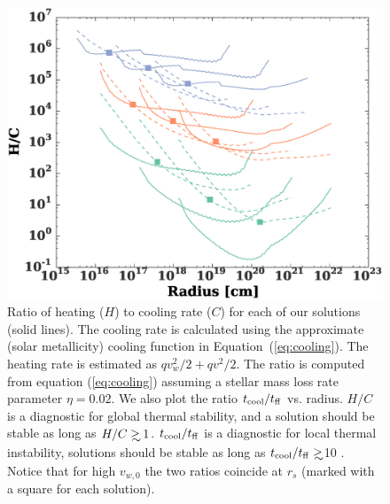 \documentclass[usenatbib,fleqn]{mn2e}
\newcommand\lsim{\mathrel{\rlap{\lower4pt\hbox{\hskip1pt$\sim$}}
    \raise1pt\hbox{$<$}}}
\newcommand\gsim{\mathrel{\rlap{\lower4pt\hbox{\hskip1pt$\sim$}}
    \raise1pt\hbox{$>$}}}
\newcommand{\rs}{r_s}
\newcommand{\vw}{v_w}
\newcommand{\vwO}{v_{w,0}}
\newcommand{\tcool}{t_{\rm cool}}
\newcommand{\tff}{t_{\rm ff}}
\begin{document}


\begin{figure}
  \includegraphics[width=\columnwidth]{cooling.eps}
  \caption{\label{fig:cooling} Ratio of heating ($H$) to cooling rate
    ($C$) for each of our solutions (solid lines). The cooling rate is
    calculated using the approximate (solar metallicity) cooling
    function in Equation~(\ref{eq:cooling}). The heating rate is
    estimated as $q \vw^2/2+q v^2/2$. The ratio is computed from
    equation (\ref{eq:cooling}) assuming a stellar mass loss rate
    parameter $\eta=0.02$. We also plot the ratio $\tcool/\tff$
    vs. radius. $H/C$ is a diagnostic for global thermal stability,
    and a solution should be stable as long as
    $H/C\gsim1$. $\tcool/\tff$ is a diagnostic for local thermal
    instability, solutions should be stable as long as $\tcool/t_{\rm
      ff}\gsim$10 \citealt{McCourt+12}. Notice that for high $\vwO$
    the two ratios coincide at $\rs$ (marked with a square for each
    solution).}
\end{figure}
\end{document}
